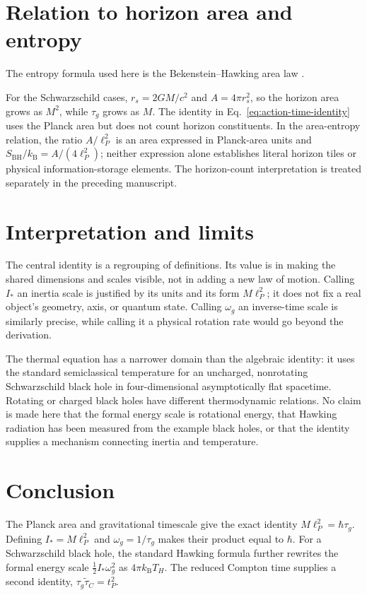 \documentclass[12pt]{article}
\begin{document}
\section{Relation to horizon area and entropy}

The entropy formula used here is the Bekenstein--Hawking area law \cite{Bekenstein}.

For the Schwarzschild cases, $r_s=2GM/c^2$ and $A=4\pi r_s^2$, so the horizon area grows as $M^2$, while $\tau_g$ grows as $M$. The identity in Eq.~\eqref{eq:action-time-identity} uses the Planck area but does not count horizon constituents. In the area-entropy relation, the ratio $A/\ell_P^2$ is an area expressed in Planck-area units and $S_{\mathrm{BH}}/k_{\mathrm B}=A/(4\ell_P^2)$; neither expression alone establishes literal horizon tiles or physical information-storage elements. The horizon-count interpretation is treated separately in the preceding manuscript.

\section{Interpretation and limits}

The central identity is a regrouping of definitions. Its value is in making the shared dimensions and scales visible, not in adding a new law of motion. Calling $I_*$ an inertia scale is justified by its units and its form $M\ell_P^2$; it does not fix a real object's geometry, axis, or quantum state. Calling $\omega_g$ an inverse-time scale is similarly precise, while calling it a physical rotation rate would go beyond the derivation.

The thermal equation has a narrower domain than the algebraic identity: it uses the standard semiclassical temperature for an uncharged, nonrotating Schwarzschild black hole in four-dimensional asymptotically flat spacetime. Rotating or charged black holes have different thermodynamic relations. No claim is made here that the formal energy scale is rotational energy, that Hawking radiation has been measured from the example black holes, or that the identity supplies a mechanism connecting inertia and temperature.

\section{Conclusion}

The Planck area and gravitational timescale give the exact identity $M\ell_P^2=\hbar\tau_g$. Defining $I_*=M\ell_P^2$ and $\omega_g=1/\tau_g$ makes their product equal to $\hbar$. For a Schwarzschild black hole, the standard Hawking formula further rewrites the formal energy scale $\tfrac12 I_*\omega_g^2$ as $4\pi k_{\mathrm B}T_H$. The reduced Compton time supplies a second identity, $\tau_g\tilde{\tau}_C=t_P^2$.
\end{document}

